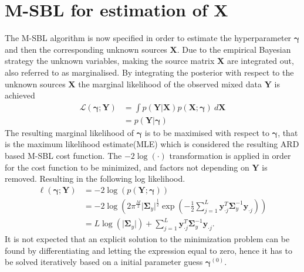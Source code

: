 \section{M-SBL for estimation of $\textbf{X}$}
The M-SBL algorithm is now specified in order to estimate the hyperparameter $\boldsymbol{\gamma}$ and then the corresponding unknown sources $\textbf{X}$.
Due to the empirical Bayesian strategy the unknown variables, making the source matrix $\mathbf{X}$ are integrated out, also referred to as marginalised.
By integrating the posterior with respect to the unknown sources $\mathbf{X}$ the marginal likelihood of the observed mixed data $\mathbf{Y}$ is achieved \cite[p. 146]{phd_wipf} 
\begin{align*}
\mathcal{L}(\boldsymbol{\gamma};\textbf{Y}) &= \int p (\mathbf{Y}  \vert \mathbf{X}) p (\mathbf{X} ; \boldsymbol{\gamma}) \ d\mathbf{X} \\
&= p (\mathbf{Y} \vert \boldsymbol{\gamma})
\end{align*}
The resulting marginal likelihood of $\boldsymbol{\gamma}$ is to be maximised with respect to $\boldsymbol{\gamma}$, that is the maximum likelihood estimate(MLE) which is considered the resulting ARD based M-SBL cost function. 
The $-2 \log (\cdot)$ transformation is applied in order for the cost function to be minimized, and factors not depending on $\textbf{Y}$ is removed. Resulting in the following log likelihood. 
\begin{align*}
\ell(\boldsymbol{\gamma};\textbf{Y})&= - 2 \log(p (\mathbf{Y} ; \boldsymbol{\gamma}))\\
&= -2\log \left( 2\pi^{\frac{M}{2}}\vert \boldsymbol{\Sigma}_{y}\vert^{\frac{1}{2}}\exp \left( - \frac{1}{2} \sum_{j=1}^L \textbf{y}_{\cdot j}^T \boldsymbol{\Sigma}_{y}^{-1} \textbf{y}_{\cdot j} \right) \right)\\
&= L \log ( \vert \boldsymbol{\Sigma}_y \vert ) + \sum_{j=1}^L \mathbf{y}_{\cdot j}^T \boldsymbol{\Sigma}_y ^{-1} \mathbf{y}_{\cdot j}.
\end{align*}
It is not expected that an explicit solution to the minimization problem can be found by differentiating and letting the expression equal to zero, hence it has to be solved iteratively based on a initial parameter guess $\boldsymbol{\gamma}^{(0)}$.
